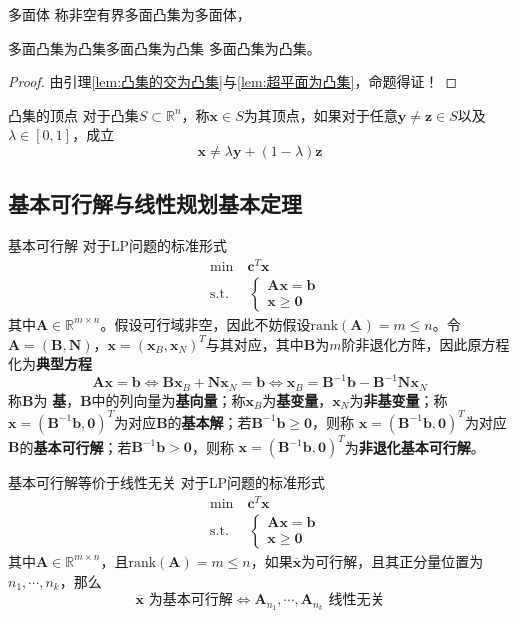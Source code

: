 \documentclass[lang = cn, scheme = chinese, thmcnt = section]{elegantbook}
\newcommand{\R}{\mathbb{R}}            %
\newcommand{\sub}{\subset}             %
\newcommand{\bs}{\boldsymbol}          %
\begin{document}
\begin{definition}{多面体}
	称非空有界多面凸集为多面体，
\end{definition}

\begin{theorem}{多面凸集为凸集}{多面凸集为凸集}
	多面凸集为凸集。
\end{theorem}

\begin{proof}
	由引理\ref{lem:凸集的交为凸集}与\ref{lem:超平面为凸集}，命题得证！
\end{proof}

\begin{definition}{凸集的顶点}
	对于凸集$S\sub\R^n$，称$\bs{x}\in S$为其顶点，如果对于任意$\bs{y}\ne\bs{z}\in S$以及$\lambda\in [0,1]$，成立
	$$
	\bs{x}\ne \lambda \bs{y} + (1 - \lambda) \bs{z}
	$$
\end{definition}

\subsection{基本可行解与线性规划基本定理}

\begin{definition}{基本可行解}
	对于LP问题的标准形式
	\begin{align*}
		& \text{min}  \quad \bs{c}^T\bs{x}\\
		& \text{s.t.} \;\, \quad \begin{cases}
			\bs{A} \bs{x} = \bs{b}\\
			\bs{x} \ge \bs{0}
		\end{cases}
	\end{align*}
	其中$\bs{A}\in\R^{m\times n}$。假设可行域非空，因此不妨假设$\text{rank}(\bs{A})=m\le n$。令$\bs{A}=(\bs{B},\bs{N})$，$\bs{x}=(\bs{x}_B,\bs{x}_N)^T$与其对应，其中$\bs{B}$为$m$阶非退化方阵，因此原方程化为{\bf{典型方程}}
	$$
	\bs{Ax}=\bs{b}
	\iff \bs{Bx}_B+\bs{Nx}_N=\bs{b}
	\iff \bs{x}_B=\bs{B}^{-1}\bs{b}-\bs{B}^{-1}\bs{Nx}_N
	$$
	称$\bs{B}$为 {\bf{基}}，$\bs{B}$中的列向量为{\bf{基向量}}；称$\bs{x}_B$为{\bf{基变量}}，$\bs{x}_N$为{\bf{非基变量}}；称$\bs{x}=(\bs{B}^{-1}\bs{b},\bs{0})^T$为对应$\bs{B}$的{\bf{基本解}}；若$\bs{B}^{-1}\bs{b}\ge\bs{0}$，则称 $\bs{x}=(\bs{B}^{-1}\bs{b},\bs{0})^T$为对应$\bs{B}$的{\bf{基本可行解}}；若$\bs{B}^{-1}\bs{b}>\bs{0}$，则称 $\bs{x}=(\bs{B}^{-1}\bs{b},\bs{0})^T$为{\bf{非退化基本可行解}}。
\end{definition}

\begin{lemma}{}{基本可行解等价于线性无关}
	对于LP问题的标准形式
	\begin{align*}
		& \text{min}  \quad \bs{c}^T\bs{x}\\
		& \text{s.t.} \;\, \quad \begin{cases}
			\bs{A} \bs{x} = \bs{b}\\
			\bs{x} \ge \bs{0}
		\end{cases}
	\end{align*}
	其中$\bs{A}\in\R^{m\times n}$，且$\text{rank}(\bs{A})=m\le n$，如果$\overline{\bs{x}}$为可行解，且其正分量位置为$n_1,\cdots,n_k$，那么
	$$
	\overline{\bs{x}}\text{ 为基本可行解}
	\iff
	\bs{A}_{n_1},\cdots,\bs{A}_{n_k}\text{ 线性无关}
	$$
\end{lemma}
\end{document}
